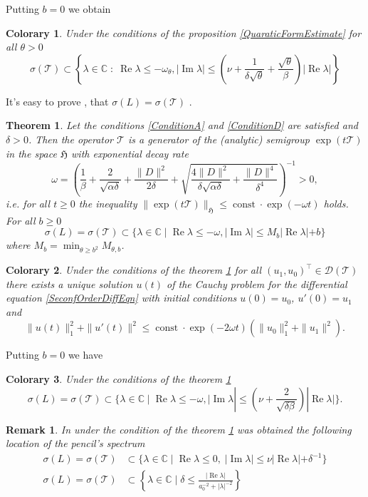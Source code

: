 \documentclass[12pt, reqno]{amsart}
\theoremstyle{plain}
\newtheorem{theorem}{Theorem}
\newtheorem{remark}{Remark}
\newtheorem{col}{Colorary}
\begin{document}
Putting $b=0$ we obtain
\begin{col}
Under the conditions of the proposition \ref{QuaraticFormEstimate}
for all $\theta>0$
 \[
    \sigma({{\mathcal{T} }})\subset\left\{\lambda\in{{\mathbb C}}\;:\;{\operatorname{Re}}\lambda\leq -\omega_\theta, 
    |{\operatorname{Im}}\lambda|\leq  \left(\nu+\frac{1}{\delta\sqrt{\theta}}+\frac{\sqrt{\theta}}{\beta}\right)
    |{\operatorname{Re}}\lambda|\right\}
 \]
\end{col}
It's easy to prove \cite{JacobTrunk09}, that $\sigma(L)=\sigma({{\mathcal{T} }})$ .
\begin{theorem}\label{MainResult}
Let the conditions \ref{ConditionA} and \ref{ConditionD} are satisfied and $\delta>0$.
Then the operator ${{\mathcal{T} }}$ is a generator of the (analytic) semigroup $\exp(t{{\mathcal{T} }})$ in the space 
${{\mathfrak H}}$ with exponential decay rate 
\[
    \omega =\left(\frac{1}{\beta}+\frac{2}{\sqrt{\alpha\delta}}+\frac{\|D\|^2}{2\delta}+
   \sqrt{\frac{4\|D\|^2}{\delta\sqrt{\alpha\delta}}+\frac{\|D\|^4}{\delta^4}}\right)^{-1}>0,
 \]
i.e. for all $t\geq0$ the inequality $\|\exp(t{{\mathcal{T} }})\|_{{\mathfrak H}}\leq {\operatorname{const}}\cdot\exp(-\omega t)$ holds. 
For all $b\geq0$
 \[
     \sigma(L)=\sigma({{\mathcal{T} }})\subset\{\lambda\in\mathbb{C}\;|\; {\operatorname{Re}}\lambda\leq -\omega,
    |{\operatorname{Im}}\lambda|\leq M_b|{\operatorname{Re}}\lambda|+b\}
 \]
where  $M_b=\min_{\theta\geq b^2}M_{\theta,b}$. 
\end{theorem}
\begin{col}
Under the conditions of the theorem \ref{MainResult} for all $(u_1,u_0)^\top\in{{\mathcal D}}({{\mathcal{T} }})$ there exists a
unique solution $u(t)$ of the Cauchy problem for the differential equation
\eqref{SeconfOrderDiffEqn} with initial conditions $u(0)=u_0$, $u'(0)=u_1$
and 
 \[
    \|u(t)\|^2_1+\|u'(t)\|^2\leq{\operatorname{const}}\cdot\exp(-2\omega t)(\|u_0\|^2_1+\|u_1\|^2).
 \]
\end{col}
Putting $b=0$ we have
\begin{col}
Under the conditions of the theorem \ref{MainResult}
 \[
     \sigma(L)=\sigma({{\mathcal{T} }})\subset\{\lambda\in\mathbb{C}\;|\; {\operatorname{Re}}\lambda\leq -\omega,
    |{\operatorname{Im}}\lambda|\leq \left(\nu+\frac{2}{\sqrt{\delta\beta}}\right)|{\operatorname{Re}}\lambda|\}.
 \]
\end{col}
\begin{remark}
In \cite{JacobTrunk09} under the condition of the theorem \ref{MainResult} was obtained the following location
of the pencil's spectrum
 \begin{align*}
     \sigma(L)=\sigma({{\mathcal{T} }})&\subset\{\lambda\in{{\mathbb C}}\;|\; {\operatorname{Re}}\lambda\leq0,\;
    |{\operatorname{Im}}\lambda|\leq \nu|{\operatorname{Re}}\lambda|+\delta^{-1}\}\\
     \sigma(L)=\sigma({{\mathcal{T} }})&\subset\left\{\lambda\in{{\mathbb C}}\;|\;\delta\leq\frac{|{\operatorname{Re}}\lambda|}{a_0^{-2}+|\lambda|^{-2}}\right\}
 \end{align*}
\end{remark}
\end{document}
